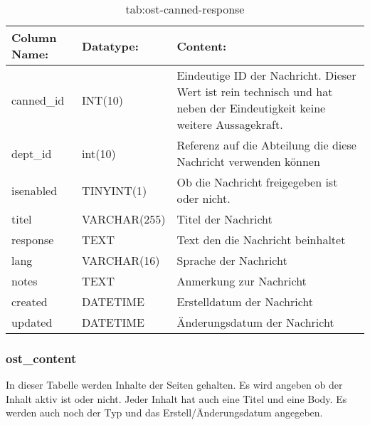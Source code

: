 \begin{table}[h]
	\begin{tabular}{|p{3.5cm}|p{4cm}|p{6.2cm}|}
		\hline
		\textbf{Column Name:} & \textbf{Datatype:} & \textbf{Content:}\\
		\hline
		canned\_id & INT(10) & Eindeutige ID der Nachricht. Dieser Wert ist rein technisch und hat  neben der Eindeutigkeit keine weitere 
		Aussagekraft.\\
		\hline
		dept\_id & int(10) & Referenz auf die Abteilung die diese Nachricht verwenden können\\
		\hline
		isenabled & TINYINT(1) & Ob die Nachricht freigegeben ist oder nicht.\\
		\hline
		titel & VARCHAR(255) & Titel der Nachricht\\
		\hline
		response & TEXT & Text den die Nachricht beinhaltet\\
		\hline
		lang & VARCHAR(16) & Sprache der Nachricht\\
		\hline
		notes & TEXT & Anmerkung zur Nachricht\\
		\hline
		created & DATETIME & Erstelldatum der Nachricht\\
		\hline
		updated & DATETIME & Änderungsdatum der Nachricht\\
		\hline
	\end{tabular}
	\caption{tab:ost-canned-response}
\end{table}
\label{tab:ost_canned_response}

\newpage

\subsubsection{ost\_content}

In dieser Tabelle werden Inhalte der Seiten gehalten. Es wird angeben ob der Inhalt aktiv ist oder nicht. Jeder Inhalt hat auch eine Titel und eine Body. Es werden auch noch der Typ und das Erstell/Änderungsdatum angegeben.

